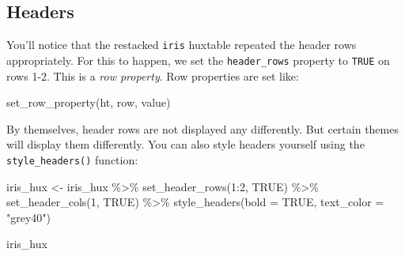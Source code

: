 \documentclass[
]{article}
\newenvironment{Shaded}{\begin{snugshade}}{\end{snugshade}}
\newcommand{\AttributeTok}[1]{\textcolor[rgb]{0.77,0.63,0.00}{#1}}
\newcommand{\ConstantTok}[1]{\textcolor[rgb]{0.00,0.00,0.00}{#1}}
\newcommand{\DecValTok}[1]{\textcolor[rgb]{0.00,0.00,0.81}{#1}}
\newcommand{\FunctionTok}[1]{\textcolor[rgb]{0.00,0.00,0.00}{#1}}
\newcommand{\NormalTok}[1]{#1}
\newcommand{\OtherTok}[1]{\textcolor[rgb]{0.56,0.35,0.01}{#1}}
\newcommand{\SpecialCharTok}[1]{\textcolor[rgb]{0.00,0.00,0.00}{#1}}
\newcommand{\StringTok}[1]{\textcolor[rgb]{0.31,0.60,0.02}{#1}}
\begin{document}
\hypertarget{headers}{%
\subsection{Headers}\label{headers}}

You'll notice that the restacked \texttt{iris} huxtable repeated the
header rows appropriately. For this to happen, we set the
\texttt{header\_rows} property to \texttt{TRUE} on rows 1-2. This is a
\emph{row property}. Row properties are set like:

\begin{Shaded}
\begin{Highlighting}[]
\FunctionTok{set\_row\_property}\NormalTok{(ht, row, value)}
\end{Highlighting}
\end{Shaded}

\FloatBarrier

By themselves, header rows are not displayed any differently. But
certain themes will display them differently. You can also style headers
yourself using the \texttt{style\_headers()} function:

\begin{Shaded}
\begin{Highlighting}[]
\NormalTok{iris\_hux }\OtherTok{\textless{}{-}}\NormalTok{ iris\_hux }\SpecialCharTok{\%\textgreater{}\%} 
      \FunctionTok{set\_header\_rows}\NormalTok{(}\DecValTok{1}\SpecialCharTok{:}\DecValTok{2}\NormalTok{, }\ConstantTok{TRUE}\NormalTok{) }\SpecialCharTok{\%\textgreater{}\%} 
      \FunctionTok{set\_header\_cols}\NormalTok{(}\DecValTok{1}\NormalTok{, }\ConstantTok{TRUE}\NormalTok{) }\SpecialCharTok{\%\textgreater{}\%} 
      \FunctionTok{style\_headers}\NormalTok{(}\AttributeTok{bold =} \ConstantTok{TRUE}\NormalTok{, }\AttributeTok{text\_color =} \StringTok{"grey40"}\NormalTok{)}

\NormalTok{iris\_hux}
\end{Highlighting}
\end{Shaded}

 
  \providecommand{\huxb}[2]{\arrayrulecolor[RGB]{#1}\global\arrayrulewidth=#2pt}
  \providecommand{\huxvb}[2]{\color[RGB]{#1}\vrule width #2pt}
  \providecommand{\huxtpad}[1]{\rule{0pt}{#1}}
  \providecommand{\huxbpad}[1]{\rule[-#1]{0pt}{#1}}
\end{document}
